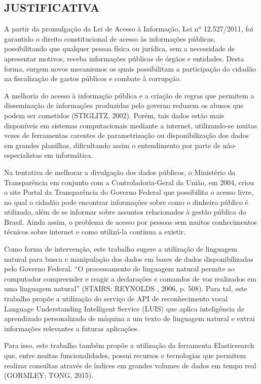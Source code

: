 \subsection{JUSTIFICATIVA}
A partir da promulgação da Lei de Acesso à Informação, Lei nº 12.527/2011, foi garantido o direito constitucional de acesso às informações públicas, possibilitando que qualquer pessoa física ou jurídica, sem a necessidade de apresentar motivos, receba informações públicas de órgãos e entidades. Desta forma, surgem novos mecanismos os quais possibilitam a participação do cidadão na fiscalização de gastos públicos e combate à corrupção.

A melhoria do acesso à informação pública e a criação de regras que permitem a disseminação de informações produzidas pelo governo reduzem os abusos que podem ser cometidos (STIGLITZ, 2002). Porém, tais dados estão mais disponíveis em sistemas computacionais mediante a internet, utilizando-se muitas vezes de ferramentas carentes de parametrização ou disponibilização dos dados em grandes planilhas, dificultando assim o entendimento por parte de não-especialistas em informática.

Na tentativa de melhorar a divulgação dos dados públicos, o Ministério da Transparência em conjunto com a Controladoria-Geral da União, em 2004, criou o site Portal da Transparência do Governo Federal que possibilita o acesso livre, no qual o cidadão pode encontrar informações sobre como o dinheiro público é utilizado, além de se informar sobre assuntos relacionados à gestão pública do Brasil.  Ainda assim, o problema de acesso por pessoas sem muitos conhecimentos técnicos sobre internet e como utilizá-la continua a existir.

Como forma de intervenção, este trabalho sugere a utilização de linguagem natural para busca e manipulação dos dados em bases de dados disponibilizadas pelo Governo Federal. “O processamento de linguagem natural permite ao computador compreender e reagir a declarações e comandos de voz realizados em uma linguagem natural” (STAIRS; REYNOLDS , 2006, p. 508). Para tal, este trabalho propõe a utilização do serviço de API de reconhecimento vocal Language Understanding Intelligent Service (LUIS) que aplica inteligência de aprendizado personalizado de máquina a um texto de linguagem natural e extrai informações relevantes a futuras aplicações.

Para isso, este trabalho também propõe a utilização da ferramenta Elasticsearch que, entre muitas funcionalidades, possui recursos e tecnologias que permitem realizar consultas através de índices em grandes volumes de dados em tempo real (GORMLEY; TONG, 2015).

